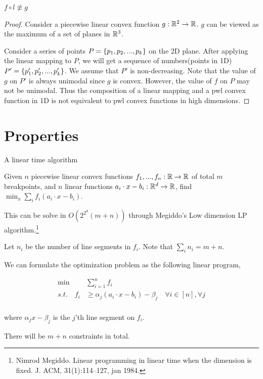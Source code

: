 \documentclass{beamer}
\begin{document}
\begin{frame}{$f\circ l\not \equiv g$}
    \begin{proof}
    \small
    Consider a piecewise linear convex function $g:\R^2\to \R$. $g$ can be viewed as the maximum of a set of planes in $\R^3$.

    Consider a series of points $P=\left\{ p_1,p_2,...,p_k \right\}$ on the 2D plane. After applying the linear mapping to $P$, we will get a sequence of numbers(points in 1D) $P'=\left\{ p_1',p_2',...,p_k' \right\}$. We assume that $P'$ is non-decreasing. Note that the value of $g$ on $P'$ is always unimodal since $g$ is convex. However, the value of $f$ on $P$ may not be unimodal. Thus the composition of a linear mapping and a pwl convex function in 1D is not equivalent to pwl convex functions in high dimensions.
    \end{proof}
\end{frame}

\section{Properties}
\begin{frame}[allowframebreaks]{A linear time algorithm}
    \begin{problem}
        Given $n$ piecewise linear convex functions $f_1,...,f_n:\R \to \R$ of total $m$ breakpoints, and $n$ linear functions $a_i\cdot x-b_i:\R^d\to \R$, find $\min_x \sum_i f_i(a_i\cdot x-b_i)$.
    \end{problem}
    This can be solve in $O(2^{2^d} (m+n))$ through Megiddo's Low dimension LP algorithm.\footnote{Nimrod Megiddo. Linear programming in linear time when the dimension is fixed. J. ACM, 31(1):114–127, jan 1984.}

    Let $n_i$ be the number of line segments in $f_i$. Note that $\sum_i n_i=m+n$.

    We can formulate the optimization problem as the following linear program,
    \newpage

    \begin{align*}
        \min &\sum_{i=1}^n f_i\\
        s.t. \quad f_i&\geq \alpha_j(a_i\cdot x -b_i)-\beta_j \quad \forall i\in[n], \forall j\\
    \end{align*}

    where $\alpha_j x - \beta_j$ is the $j$'th line segment on $f_i$.

    There will be $m+n$ constraints in total.
\end{frame}
\end{document}
